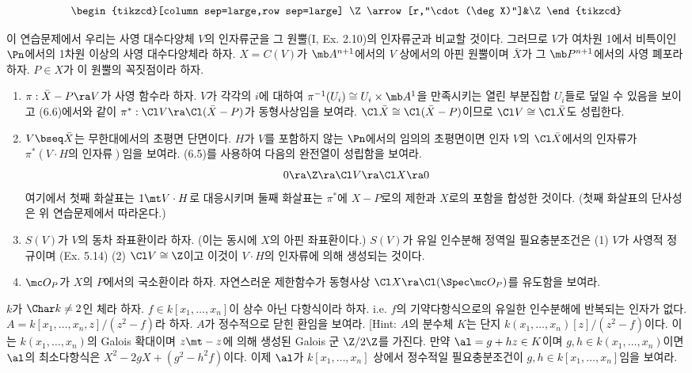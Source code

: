 \begin{enumerate}[label=\tb{6.\arabic*.},itemindent=0mm,itemsep=2mm]
{\begin{enumerate}[label=(\alph*)]
$$\begin{tikzcd}[column sep=large,row sep=large]
	\Z\arrow[r,"\cdot(\deg X)"]&\Z\end{tikzcd}$$
	\end{enumerate}
	\item {} 이 연습문제에서 우리는 사영 대수다양체 $V$의 인자류군을 그 원뿔(I, Ex. 2.10)의 인자류군과 비교할 것이다.
	그러므로 $V$가 여차원 1에서 비특이인 $\Pn$에서의 1차원 이상의 사영 대수다양체라 하자.
	$X=C(V)$가 $\mb A^{n+1}$에서의 $V$ 상에서의 아핀 원뿔이며 $\bar X$가 그 $\mb P^{n+1}$에서의 사영 폐포라 하자.
	$P\in X$가 이 원뿔의 꼭짓점이라 하자.
	\begin{enumerate}[label=(\alph*)]
	\item $\pi:\bar X-P\ra V$가 사영 함수라 하자. $V$가 각각의 $i$에 대하여
	$\pi^{-1}(U_i)\cong U_i\times\mb A^1$을 만족시키는 열린 부분집합 $U_i$들로 덮일 수 있음을 보이고
	(6.6)에서와 같이 $\pi^*:\Cl V\ra\Cl(\bar X-P)$가 동형사상임을 보여라.
	$\Cl\bar X\cong\Cl(\bar X-P)$이므로 $\Cl V\cong\Cl\bar X$도 성립한다.
	\item $V\bseq\bar X$는 무한대에서의 초평면 단면이다.
	$H$가 $V$를 포함하지 않는 $\Pn$에서의 임의의 초평면이면
	인자 $V$의 $\Cl\bar X$에서의 인자류가 $\pi^*(V\cdot H\text{의 인자류})$임을 보여라.
	(6.5)를 사용하여 다음의 완전열이 성립함을 보여라.
	$$0\ra\Z\ra\Cl V\ra\Cl X\ra 0$$
	여기에서 첫째 화살표는 $1\mt V\cdot H$로 대응시키며 둘째 화살표는 $\pi^*$에 $X-P$로의 제한과 $X$로의 포함을 합성한 것이다.
	(첫째 화살표의 단사성은 위 연습문제에서 따라온다.)
	\item $S(V)$가 $V$의 동차 좌표환이라 하자. (이는 동시에 $X$의 아핀 좌표환이다.)
	$S(V)$가 유일 인수분해 정역일 필요충분조건은 (1) $V$가 사영적 정규이며 (Ex. 5.14)
	(2) $\Cl V\cong\Z$이고 이것이 $V\cdot H$의 인자류에 의해 생성되는 것이다.
	\item $\mc O_P$가 $X$의 $P$에서의 국소환이라 하자. 자연스러운 제한함수가 동형사상 $\Cl X\ra\Cl(\Spec\mc O_P)$를 유도함을 보여라.
	\end{enumerate}}
	\item $k$가 $\Char k\ne 2$인 체라 하자. $f\in k[x_1,\ldots,x_n]$이  상수 아닌 다항식이라 하자.
	i.e. $f$의 기약다항식으로의 유일한 인수분해에 반복되는 인자가 없다.
	$A=k[x_1,\ldots,x_n,z]/(z^2-f)$라 하자. $A$가 정수적으로 닫힌 환임을 보여라.
	[Hint: $A$의 분수체 $K$는 단지 $k(x_1,\ldots,x_n)[z]/(z^2-f)$이다.
	이는 $k(x_1,\ldots,x_n)$의 Galois 확대이며 $z\mt -z$에 의해 생성된 Galois 군 $\Z/2\Z$를 가진다.
	만약 $\al=g+hz\in K$이며 $g,h\in k(x_1,\ldots,x_n)$이면 $\al$의 최소다항식은 $X^2-2gX+(g^2-h^2f)$이다.
	이제 $\al$가 $k[x_1,\ldots,x_n]$ 상에서 정수적일 필요충분조건이 $g,h\in k[x_1,\ldots,x_n]$임을 보여라.

\end{enumerate}
